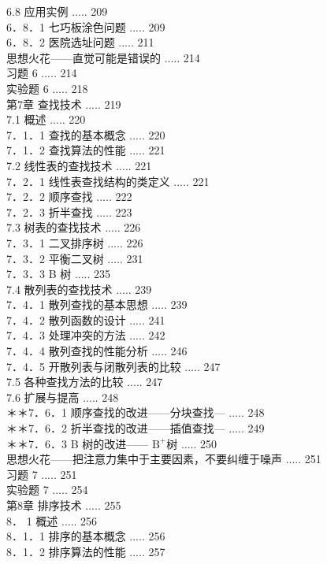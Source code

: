 \documentclass[10pt]{article}
\begin{document}
6.8 应用实例 ..... 209\\
6．8．1 七巧板涂色问题 ..... 209\\
6．8．2 医院选址问题 ..... 211\\
思想火花——直觉可能是错误的 ..... 214\\
习题 6 ..... 214\\
实验题 6 ..... 218\\
第7章 查找技术 ..... 219\\
7.1 概述 ..... 220\\
7．1．1 查找的基本概念 ..... 220\\
7．1．2 查找算法的性能 ..... 221\\
7.2 线性表的查找技术 ..... 221\\
7．2．1 线性表查找结构的类定义 ..... 221\\
7．2．2 顺序查找 ..... 222\\
7．2．3 折半查找 ..... 223\\
7.3 树表的查找技术 ..... 226\\
7．3．1 二叉排序树 ..... 226\\
7．3．2 平衡二叉树 ..... 231\\
7．3．3 B 树 ..... 235\\
7.4 散列表的查找技术 ..... 239\\
7．4．1 散列查找的基本思想 ..... 239\\
7．4．2 散列函数的设计 ..... 241\\
7．4．3 处理冲突的方法 ..... 242\\
7．4．4 散列查找的性能分析 ..... 246\\
7．4．5 开散列表与闭散列表的比较 ..... 247\\
7.5 各种查找方法的比较 ..... 247\\
7.6 扩展与提高 ..... 248\\
＊＊7．6．1 顺序查找的改进——分块查找— ..... 248\\
＊＊7．6．2 折半查找的改进——插值查找— ..... 249\\
＊＊7．6．3 B 树的改进—— $\mathrm{B}^{+}$树 ..... 250\\
思想火花——把注意力集中于主要因素，不要纠缠于噪声 ..... 251\\
习题 7 ..... 251\\
实验题 7 ..... 254\\
第8章 排序技术 ..... 255\\
8． 1 概述 ..... 256\\
8．1．1 排序的基本概念 ..... 256\\
8．1．2 排序算法的性能 ..... 257\\
\end{document}
